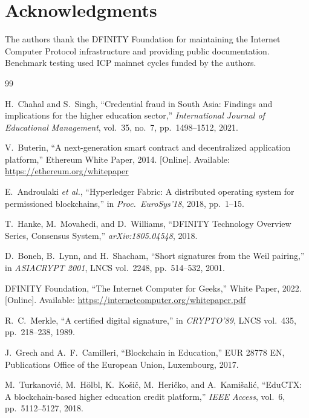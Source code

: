 \documentclass[journal]{IEEEtran}
\begin{document}
\section*{Acknowledgments}
The authors thank the DFINITY Foundation for maintaining the Internet Computer Protocol infrastructure and providing public documentation. Benchmark testing used ICP mainnet cycles funded by the authors.

\balance
\begin{thebibliography}{99}

H.~Chahal and S.~Singh,
``Credential fraud in South Asia: Findings and implications for the higher education sector,''
\textit{International Journal of Educational Management}, vol.~35, no.~7, pp.~1498--1512, 2021.

V.~Buterin,
``A next-generation smart contract and decentralized application platform,''
Ethereum White Paper, 2014.
[Online]. Available: \url{https://ethereum.org/whitepaper}

E.~Androulaki \textit{et al.},
``Hyperledger Fabric: A distributed operating system for permissioned blockchains,''
in \textit{Proc.\ EuroSys'18}, 2018, pp.~1--15.

T.~Hanke, M.~Movahedi, and D.~Williams,
``DFINITY Technology Overview Series, Consensus System,''
\textit{arXiv:1805.04548}, 2018.

D.~Boneh, B.~Lynn, and H.~Shacham,
``Short signatures from the Weil pairing,''
in \textit{ASIACRYPT 2001}, LNCS vol.~2248, pp.~514--532, 2001.

DFINITY Foundation,
``The Internet Computer for Geeks,''
White Paper, 2022.
[Online]. Available: \url{https://internetcomputer.org/whitepaper.pdf}

R.~C.~Merkle,
``A certified digital signature,''
in \textit{CRYPTO'89}, LNCS vol.~435, pp.~218--238, 1989.

J.~Grech and A.~F.~Camilleri,
``Blockchain in Education,''
EUR 28778 EN, Publications Office of the European Union, Luxembourg, 2017.

M.~Turkanovi\'{c}, M.~H\"{o}lbl, K.~Ko\v{s}i\v{c}, M.~Heri\v{c}ko, and A.~Kami\v{s}ali\'{c},
``EduCTX: A blockchain-based higher education credit platform,''
\textit{IEEE Access}, vol.~6, pp.~5112--5127, 2018.


\end{thebibliography}
\end{document}
